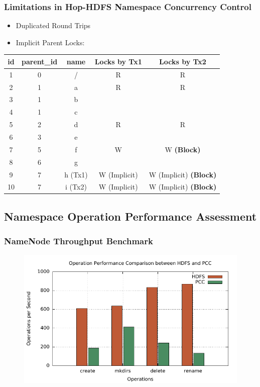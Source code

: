\documentclass{beamer}
\begin{document}
\begin{frame}
	\frametitle{Limitations in Hop-HDFS Namespace Concurrency Control}
		\begin{itemize}
			\item Duplicated Round Trips
			\item Implicit Parent Locks:
		\end{itemize}
\begin{table}[h]
	\centering
	\begin{tabular}{|c|c|c|c|c|}
		\hline
		\textbf{id} & \textbf{parent\_id} & \textbf{name} & \textbf{Locks by Tx1} & \textbf{Locks by Tx2} \\ \hline
		1 & 0 & / & R & R \\ \hline
		2 & 1 & a & R & R \\ \hline
		3 & 1 & b & ~ & ~ \\ \hline
		4 & 1 & c & ~ & ~ \\ \hline
		5 & 2 & d & R & R\\ \hline
		6 & 3 & e & ~ & ~ \\ \hline
		7 & 5 & f  & W & W \textbf{(Block)} \\ \hline
		8 & 6 & g & ~ & ~ \\ \hline
		9 & 7 & h (Tx1) & W (Implicit) & W (Implicit) \textbf{(Block)}\\ \hline
		10 & 7 & i (Tx2) & W (Implicit) & W (Implicit)  \textbf{(Block)}\\ \hline
	\end{tabular}
\end{table}
\end{frame}

\subsection{Namespace Operation Performance Assessment}
\begin{frame}
	\frametitle{NameNode Throughput Benchmark}
	\begin{figure}[h]
		\centering
		\includegraphics[width=\linewidth]{figs/nn_100.pdf}
	\end{figure}
\end{frame}
\end{document}

